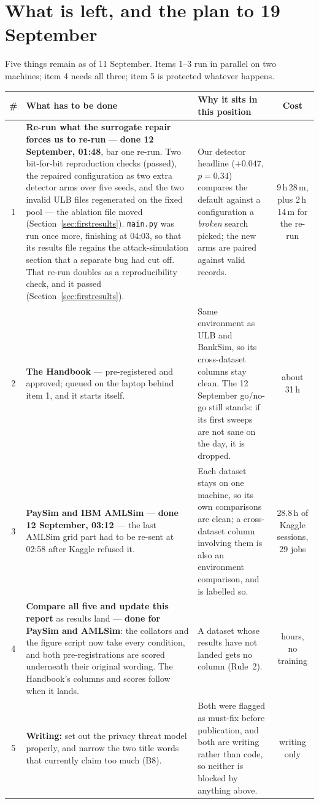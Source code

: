 \documentclass[11pt]{article}
\begin{document}
\section{What is left, and the plan to 19 September}

Five things remain as of 11 September. Items 1--3 run in parallel on two machines; item 4 needs all
three; item 5 is protected whatever happens.

\begin{center}\small
\renewcommand{\arraystretch}{1.2}
\begin{tabularx}{\linewidth}{@{}c p{4.2cm} X c@{}}
\toprule
\textbf{\#} & \textbf{What has to be done} & \textbf{Why it sits in this position} & \textbf{Cost} \\
\midrule
1 & \textbf{Re-run what the surrogate repair forces us to re-run} --- \textbf{done 12 September, 01:48}, bar one re-run. Two bit-for-bit reproduction checks (passed), the repaired configuration as two extra detector arms over five seeds, and the two invalid ULB files regenerated on the fixed pool --- the ablation file moved (Section~\ref{sec:firstresults}). \texttt{main.py} was run once more, finishing at 04:03, so that its results file regains the attack-simulation section that a separate bug had cut off. That re-run doubles as a reproducibility check, and it passed (Section~\ref{sec:firstresults}). & Our detector headline ($+0.047$, $p = 0.34$) compares the default against a configuration a \emph{broken} search picked; the new arms are paired against valid records. & 9\,h\,28\,m, plus 2\,h\,14\,m for the re-run \\
2 & \textbf{The Handbook} --- pre-registered and approved; queued on the laptop behind item 1, and it starts itself. & Same environment as ULB and BankSim, so its cross-dataset columns stay clean. The 12 September go/no-go still stands: if its first sweeps are not sane on the day, it is dropped. & about 31\,h \\
3 & \textbf{PaySim and IBM AMLSim} --- \textbf{done 12 September, 03:12} --- the last AMLSim grid part had to be re-sent at 02:58 after Kaggle refused it. & Each dataset stays on one machine, so its own comparisons are clean; a cross-dataset column involving them is also an environment comparison, and is labelled so. & 28.8\,h of Kaggle sessions, 29 jobs \\
4 & \textbf{Compare all five and update this report} as results land --- \textbf{done for PaySim and AMLSim}: the collators and the figure script now take every condition, and both pre-registrations are scored underneath their original wording. The Handbook's columns and scores follow when it lands. & A dataset whose results have not landed gets no column (Rule~2). & hours, no training \\
5 & \textbf{Writing:} set out the privacy threat model properly, and narrow the two title words that currently claim too much (B8). & Both were flagged as must-fix before publication, and both are writing rather than code, so neither is blocked by anything above. & writing only \\
\bottomrule
\end{tabularx}
\end{center}
\end{document}
